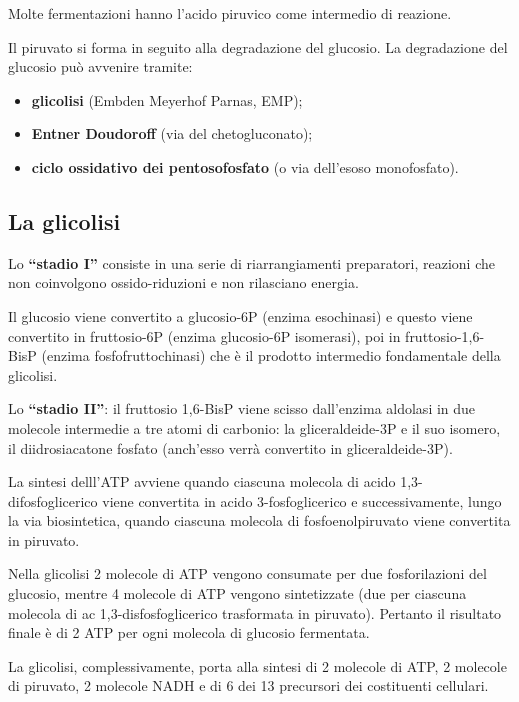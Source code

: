 \documentclass[11pt]{book}
\begin{document}
Molte fermentazioni hanno l’acido piruvico come intermedio di reazione.

Il piruvato si forma in seguito alla degradazione del glucosio.
La degradazione del glucosio può avvenire tramite:
\begin{itemize}
\item \textbf{glicolisi} (Embden Meyerhof Parnas, EMP);
\item \textbf{Entner Doudoroff} (via del chetogluconato);
\item \textbf{ciclo ossidativo dei pentosofosfato} (o via dell’esoso monofosfato).
\end{itemize}

\subsection{La glicolisi}
Lo \textbf{``stadio I''} consiste in una serie di riarrangiamenti preparatori, reazioni che non coinvolgono ossido-riduzioni e non rilasciano energia. 

Il glucosio viene convertito a glucosio-6P (enzima esochinasi) e questo viene convertito in fruttosio-6P (enzima glucosio-6P isomerasi), poi in fruttosio-1,6-BisP (enzima fosfofruttochinasi) che è il prodotto intermedio fondamentale della glicolisi.

Lo \textbf{``stadio II''}: il fruttosio 1,6-BisP viene scisso dall’enzima aldolasi in due molecole intermedie a tre atomi di carbonio: la gliceraldeide-3P e il suo isomero, il diidrosiacatone fosfato (anch’esso verrà convertito in gliceraldeide-3P).

La sintesi delll’ATP avviene quando ciascuna molecola di acido 1,3-difosfoglicerico viene convertita in acido 3-fosfoglicerico e successivamente, lungo la via biosintetica, quando ciascuna molecola di fosfoenolpiruvato viene convertita in piruvato. 

Nella glicolisi 2 molecole di ATP vengono consumate per due fosforilazioni del glucosio, mentre 4 molecole di ATP vengono sintetizzate (due per ciascuna molecola di ac 1,3-disfosfoglicerico trasformata in piruvato). Pertanto il risultato finale è di 2 ATP per ogni molecola di glucosio fermentata.

La glicolisi, complessivamente, porta alla sintesi di 2 molecole di ATP, 2 molecole di piruvato, 2 molecole NADH e di 6 dei 13 precursori dei costituenti cellulari.
\end{document}
